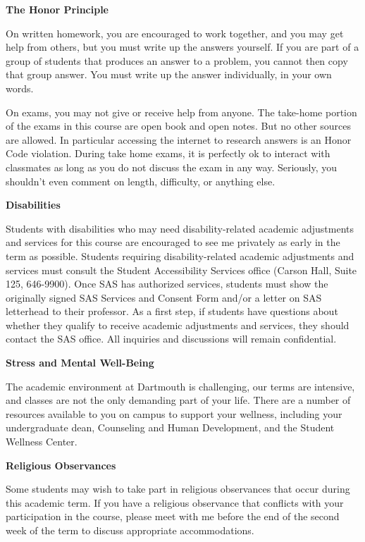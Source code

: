 \documentclass{article}
\begin{document}
    \textbf{The Honor Principle}
    \par\hfill\par
    On written homework, you are encouraged to work together, and you may get
    help from others, but you must write up the answers yourself. If you
    are part of a group of students that produces an answer to a problem,
    you cannot then copy that group answer. You must write up the answer
    individually, in your own words.
    \par\hfill\par
    On exams, you may not give or receive help from anyone.
    The take-home portion of the exams in this course are open book and open
    notes. But no other sources are allowed. In particular accessing the
    internet to research answers is an Honor Code violation. During take home
    exams, it is perfectly ok to interact with classmates as long as you do not
    discuss the exam in any way. Seriously, you shouldn't even comment on
    length, difficulty, or anything else.
    \par\hfill\par
    \textbf{Disabilities}
    \par\hfill\par
    Students with disabilities who may need disability-related academic
    adjustments and services for this course are encouraged to see me privately
    as early in the term as possible. Students requiring disability-related
    academic adjustments and services must consult the Student Accessibility
    Services office (Carson Hall, Suite 125, 646-9900). Once SAS has authorized
    services, students must show the originally signed SAS Services and Consent
    Form and/or a letter on SAS letterhead to their professor. As a first step,
    if students have questions about whether they qualify to receive academic
    adjustments and services, they should contact the SAS office. All inquiries
    and discussions will remain confidential.
    \par\hfill\par
    \textbf{Stress and Mental Well-Being}
    \par\hfill\par
    The academic environment at Dartmouth is challenging, our terms are
    intensive, and classes are not the only demanding part of your life. There
    are a number of resources available to you on campus to support your
    wellness, including your undergraduate dean, Counseling and Human
    Development, and the Student Wellness Center.
    \par\hfill\par
    \textbf{Religious Observances}
    \par\hfill\par
    Some students may wish to take part in religious observances that occur
    during this academic term. If you have a religious observance that
    conflicts with your participation in the course, please meet with me before
    the end of the second week of the term to discuss appropriate
    accommodations.
\end{document}
